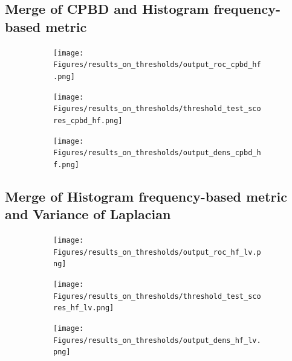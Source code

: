 \subsection{Merge of CPBD and Histogram frequency-based metric}
\begin{figure}[H]
    \centering
    \begin{subfigure}[t]{0.48\textwidth}
        \texttt{[image: Figures/results\_on\_thresholds/output\_roc\_cpbd\_hf.png]}
        \caption{}
        \label{fig:CPBD_HF_roc}
    \end{subfigure}\hspace{1em}
    \begin{subfigure}[t]{0.48\textwidth}
        \texttt{[image: Figures/results\_on\_thresholds/threshold\_test\_scores\_cpbd\_hf.png]}
        \caption{}
        \label{fig:CPBD_HF_thresh}
    \end{subfigure}\hspace{1em}
    \begin{subfigure}[t]{0.48\textwidth}
        \texttt{[image: Figures/results\_on\_thresholds/output\_dens\_cpbd\_hf.png]}
        \caption{}
        \label{fig:CPBD_HF_dens}
    \end{subfigure}\hspace{1em}
    \caption{}
    \label{fig:CPBD_HF_final}
\end{figure}

\subsection{Merge of Histogram frequency-based metric and Variance of Laplacian}
\begin{figure}[H]
    \centering
    \begin{subfigure}[t]{0.48\textwidth}
        \texttt{[image: Figures/results\_on\_thresholds/output\_roc\_hf\_lv.png]}
        \caption{}
        \label{fig:HF_LV_roc}
    \end{subfigure}\hspace{1em}
    \begin{subfigure}[t]{0.48\textwidth}
        \texttt{[image: Figures/results\_on\_thresholds/threshold\_test\_scores\_hf\_lv.png]}
        \caption{}
        \label{fig:HF_LV_thresh}
    \end{subfigure}\hspace{1em}
    \begin{subfigure}[t]{0.48\textwidth}
        \texttt{[image: Figures/results\_on\_thresholds/output\_dens\_hf\_lv.png]}
        \caption{}
        \label{fig:HF_LV_dens}
    \end{subfigure}\hspace{1em}
    \caption{}
    \label{fig:HF_LV_final}
\end{figure}

